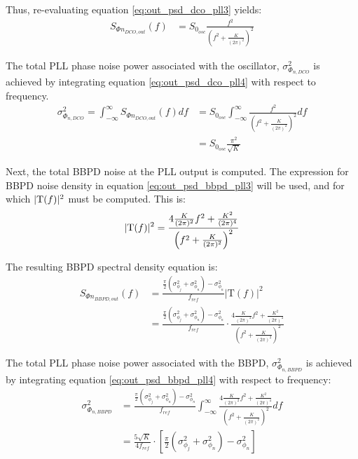 			Thus, re-evaluating equation \ref{eq:out_psd_dco_pll3} yields:
			\begin{align}\label{eq:out_psd_dco_pll4} 
				S_{\Phi n_{DCO,out}}(f) &= S_{0_{osc}}\frac{f^2}{\left(f^2+\frac{K}{(2\pi)^2}\right)^2} 
			\end{align} 

			The total PLL phase noise power associated with the oscillator, $\sigma_{\Phi_{n,DCO}}^2$ is achieved by integrating equation \ref{eq:out_psd_dco_pll4} with respect to frequency.
			\begin{align}\label{eq:out_psd_dco_pll5} 
				\sigma_{\Phi_{n,DCO}}^2 =
				\int_{-\infty}^{\infty} S_{\Phi n_{DCO,out}}(f)df &=
				S_{0_{osc}}\int_{-\infty}^{\infty}\frac{f^2}{\left(f^2+\frac{K}{(2\pi)^2}\right)^2}df
				\\ &= S_{0_{osc}}\frac{\pi^2}{\sqrt{K}} 
			\end{align} 

			Next, the total BBPD noise at the PLL output is computed. The expression for BBPD noise density in equation \ref{eq:out_psd_bbpd_pll3} will be used, and for which $|\textnormal{T}(f)|^2$ must be computed. This is: 
			\begin{equation} 
				|\textnormal{T}(f)|^2 =
				\frac{4\frac{K}{(2\pi)^2}f^2 +
				\frac{K^2}{(2\pi)^4}}{\left(f^2+\frac{K}{(2\pi)^2}\right)^2} 
			\end{equation}

			The resulting BBPD spectral density equation is:
			\begin{align}\label{eq:out_psd_bbpd_pll4} 
				S_{\Phi n_{BBPD,out}}(f) & =
				\frac{\frac{\pi}{2}(\sigma^2_{\phi_j} +
				\sigma^2_{\phi_n})-\sigma^2_{\phi_n}}{f_{ref}}\left|\mathrm{T}(f)\right|^2
				\\&= \frac{\frac{\pi}{2}(\sigma^2_{\phi_j} +
				\sigma^2_{\phi_n})-\sigma^2_{\phi_n}}{f_{ref}}\cdot\frac{4\frac{K}{(2\pi)^2}f^2
				+ \frac{K^2}{(2\pi)^4}}{\left(f^2+\frac{K}{(2\pi)^2}\right)^2} 
			\end{align} 

			The total PLL phase noise power associated with the BBPD, $\sigma_{\Phi_{n,BBPD}}^2$ is achieved by integrating equation \ref{eq:out_psd_bbpd_pll4} with respect to frequency:
			\begin{align}\label{eq:out_psd_bbpd_pll5} 
				\sigma_{\Phi_{n,BBPD}}^2 & =
				\frac{\frac{\pi}{2}(\sigma^2_{\phi_j} +
				\sigma^2_{\phi_n})-\sigma^2_{\phi_n}}{f_{ref}}\int_{-\infty}^{\infty}\frac{4\frac{K}{(2\pi)^2}f^2
				+ \frac{K^2}{(2\pi)^4}}{\left(f^2+\frac{K}{(2\pi)^2}\right)^2}df\\ 
				&= \frac{5\sqrt{K}}{4f_{ref}}\cdot\left[\frac{\pi}{2}(\sigma^2_{\phi_j} +
				\sigma^2_{\phi_n})-\sigma^2_{\phi_n}\right] 
			\end{align} 

